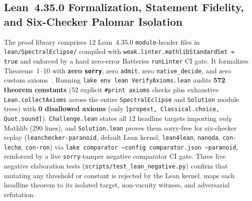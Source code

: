 \documentclass[11pt,reqno]{amsart}
\theoremstyle{definition}
\newcommand{\id}[1]{\textnormal{\texttt{\small #1}}}
\newcommand{\idb}[1]{\textnormal{\texttt{\footnotesize #1}}}
\newcommand{\ub}{\_\allowbreak}
\begin{document}
\subsection{Lean~4.35.0 Formalization, Statement Fidelity, and Six-Checker Palomar Isolation}

The proof library comprises $12$ Lean~4.35.0 \texttt{module}-header files in \id{lean/SpectralEclipse/} compiled with \idb{weak.\allowbreak linter.\allowbreak mathlibStandardSet = true} and enforced by a hard zero-error Batteries \idb{runLinter} CI gate. It formalizes Theorems~1--10 with \textbf{zero \texttt{sorry}}, zero \texttt{admit}, zero \idb{native\ub decide}, and zero custom axioms~\cite{demoura2021}. Running \idb{lake env lean VerifyAxioms.lean} audits \textbf{572 theorem constants} ($52$ explicit \idb{\#print axioms} checks plus exhaustive \idb{Lean.collectAxioms} across the entire \id{SpectralEclipse} and \id{Solution} module trees) with \textbf{0 disallowed axioms} (only \idb{[propext, Classical.choice, Quot.sound]}). \id{Challenge.lean} states all $12$ headline targets importing \emph{only} Mathlib ($290$ lines), and \id{Solution.lean} proves them sorry-free for six-checker replay (\idb{leanchecker-paranoid}, default Lean kernel, \idb{lean4lean}, \idb{nanoda}, \idb{con-leche}, \idb{con-ron}) via \idb{lake comparator --config comparator.json --paranoid}, reinforced by a live \texttt{sorry}-tamper negative comparator CI gate. Three live negative elaboration tests (\idb{scripts/test\ub lean\ub negative.py}) confirm that mutating any threshold or constant is rejected by the Lean kernel.  maps each headline theorem to its isolated target, non-vacuity witness, and adversarial refutation.
\end{document}
